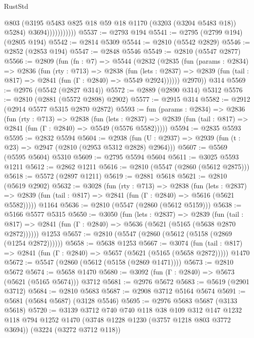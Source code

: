\begin{lexlean}{RustStd}
\begin{coremodule}
                          @803
                          (@3195 @5483 @825 @18 @59 @18 @1170 (@3203 (@3204 @5483 @18)) @5284)
                          @3694)))))))))))
@5537 := @2793 @194
@5541 := @2795 (@2799 @194) (@2805 @194)
@5542 := @2814 @5309
@5544 := @2810 (@5542 @2829)
@5546 := @2852 (@2853 @194)
@5547 := @2848 @5546
@5549 := @2810 (@5547 @2877)
@5566 := @2809
    (fun (fn : @7) =>
    @5544
      (@2832
        (@2835
          (fun (params : @2834) =>
          @2836
            (fun (rty : @713) =>
            @2838
              (fun (lets : @2837) =>
              @2839 (fun (tail : @817) => @2841 (fun (Γ : @2840) => @5549 @2924))))))
        @2970))
    @314
@5569 := @2976 (@5542 (@2827 @314))
@5572 := @2889 (@2890 @314) @5312
@5576 := @2810 (@2881 (@5572 @2898) @2902)
@5577 := @2915 @314
@5582 := @2912 (@2914 @5577 @5315 @2870 @2872)
@5593 := fun (params : @2834) =>
  @2836
    (fun (rty : @713) =>
    @2838
      (fun (lets : @2837) =>
      @2839 (fun (tail : @817) => @2841 (fun (Γ : @2840) => @5549 (@5576 @5582)))))
@5594 := @2835 @5593
@5595 := @2832 @5594
@5604 := @2938 (fun (U : @2937) => @2939 (fun (t : @23) => @2947 (@2810 (@2953 @5312 @2828) @2964)))
@5607 := @5569 (@5595 @5604) @5310
@5609 := @2795 @5594 @5604
@5611 := @3025 @5593 @1211
@5612 := @2862 @1211
@5616 := @2810 (@5547 (@2860 (@5612 @2875)))
@5618 := @5572 (@2897 @1211)
@5619 := @2881 @5618
@5621 := @2810 (@5619 @2902)
@5632 := @3028
    (fun (rty : @713) =>
    @2838
      (fun (lets : @2837) =>
      @2839 (fun (tail : @817) => @2841 (fun (Γ : @2840) => @5616 (@5621 @5582)))))
    @1164
@5636 := @2810 (@5547 (@2860 (@5612 @5159)))
@5638 := @5166 @5577 @5315
@5650 := @3050
    (fun (lets : @2837) =>
    @2839
      (fun (tail : @817) => @2841 (fun (Γ : @2840) => @5636 (@5621 (@5165 (@5638 @2870 @2872))))))
    @1253
@5657 := @2810 (@5547 (@2860 (@5612 (@5158 (@2869 (@1254 @2872))))))
@5658 := @5638 @1253
@5667 := @3074
    (fun (tail : @817) => @2841 (fun (Γ : @2840) => @5657 (@5621 (@5165 (@5658 @2872)))))
    @1470
@5672 := @5547 (@2860 (@5612 (@5158 (@2869 @1471))))
@5673 := @2810 @5672
@5674 := @5658 @1470
@5680 := @3092 (fun (Γ : @2840) => @5673 (@5621 (@5165 @5674))) @3712
@5681 := @2976 @5672
@5683 := @5619 (@2901 @3712)
@5684 := @2810 @5683
@5687 := @2908 @3712 @5164 @5674
@5691 := @5681 (@5684 @5687) (@3128 @5546)
@5695 := @2976 @5683 @5687 (@3133 @5618)
@5720 := @3139
    @3712
    @740
    @740
    @118
    @38
    @109
    @312
    @147
    @1232
    @118
    @794
    @1252
    @1470
    (@3748 @1228 @1230 (@3757 @1218 @803 @3772 @3694))
    (@3224 (@3272 @3712 @118))

\end{coremodule}
\end{lexlean}
